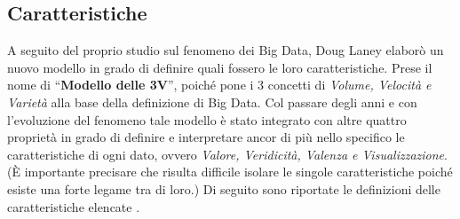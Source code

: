 \subsection{Caratteristiche}

A seguito del proprio studio sul fenomeno dei Big Data, Doug Laney elaborò un nuovo modello in grado di definire quali fossero le loro caratteristiche. Prese il nome di “\textbf{Modello delle 3V}”, poiché pone i 3 concetti di \textit{Volume, Velocità e Varietà} alla base della definizione di Big Data. Col passare degli anni e con l'evoluzione del fenomeno tale modello è stato integrato con altre quattro proprietà in grado di definire e interpretare ancor di più nello specifico le caratteristiche di ogni dato, ovvero \textit{Valore, Veridicità, Valenza e Visualizzazione}. (È importante precisare che risulta difficile isolare le singole caratteristiche poiché esiste una forte legame tra di loro.) Di seguito sono riportate le definizioni delle caratteristiche elencate \cite{agcom_big_data}.
